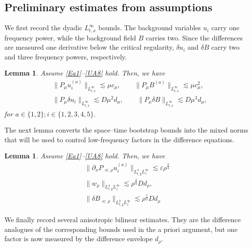 \documentclass[11pt,letterpaper,reqno]{amsart}
\numberwithin{equation}{section}
\newtheorem{lemma}[theorem]{Lemma}
\theoremstyle{definition}
\theoremstyle{remark}
\begin{document}
\subsection{Preliminary estimates from  assumptions}
We first record the dyadic \(L^\infty_{t,x}\) bounds. The background
variables \(u_i\) carry one frequency power, while the background field
\(B\) carries two. Since the differences are measured one derivative below
the critical regularity, \(\delta u_i\) and \(\delta B\) carry two and three
frequency powers, respectively.
\begin{lemma} Assume \eqref{Ea1}--\eqref{UA8} hold. Then, we have
\begin{align}
       &\|P_\mu u_i^{(a)}\|_{L^\infty_{t,x}}
        \lesssim
        \mu c_\mu,\qquad\|P_\mu B^{(a)}\|_{L^\infty_{t,x}}
        \lesssim
        \mu c_\mu^2,
         \\
          &\|P_\mu \delta u_i\|_{L^\infty_{t,x}}
        \lesssim
        D\mu^2 d_\mu,
        \qquad
        \|P_\mu\delta B\|_{L^\infty_{t,x}}
        \lesssim
        D\mu^3 d_\mu,
\end{align}
for \(a \in \{1,2\}; i \in \{1,2,3,4,5\}. \)
 
\end{lemma}
The next lemma converts the space--time bootstrap bounds into the mixed norms
that will be used to control low-frequency factors in the difference
equations.
\begin{lemma} Assume \eqref{Ea1}--\eqref{UA8} hold. Then, we have
    \begin{align} 
    \|  \partial_x P_{\ll \rho} u_i^{(a)}\|_{L^4_{t,y} L^\infty_z} \lesssim \varepsilon  \rho^{\frac 34} \label{pre.ua.L4.infty1}\\
        \|   w_{\rho}\|_{L^4_{t,y}L^\infty_z} \lesssim \rho^{\frac 34} D d_\rho, \label{pre.uni.L4.es1} \\
        \|\delta B_{\ll \rho} \|_{L^2_{t,y} L^\infty_z} \lesssim \rho^{\frac 12} D d_\rho
 \label{pre.uni.deltB.es1} 
    \end{align}
\end{lemma}

We finally record several anisotropic bilinear estimates. They are the
difference analogues of the corresponding bounds used in the a priori
argument, but one factor is now measured by the difference envelope
\(d_\rho\).
\end{document}
